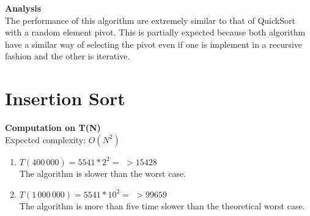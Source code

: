 \documentclass{article}
\begin{document}
\textbf{Analysis}\\

The performance of this algorithm are extremely similar to that of QuickSort with a random element pivot. This is partially expected because both algorithm have a similar way of selecting the pivot even if one is implement in a recursive fashion and the other is iterative.

\newpage
\section{Insertion Sort}

\begin{center}
\end{center}

\textbf{Computation on T(N)}\\

Expected complexity: $O(N^2)$\\

\begin{enumerate}
    \item $T(400\,000) = 5541 *2^2 =$
    $> 15428$\\
    The algorithm is slower than the worst case.
    
    \item $T(1\,000\,000) = 5541 *10^2 =$
    $> 99659$\\
    The algorithm is more than five time slower than the theoretical worst case.
    
\end{enumerate}
\end{document}
